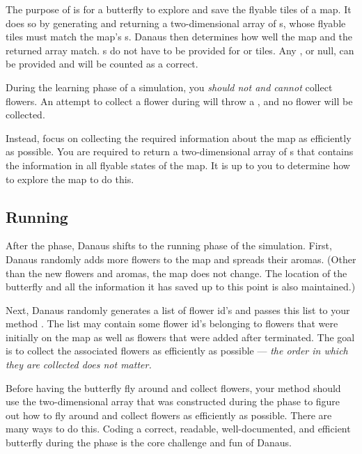 \documentclass{pset}
\begin{document}
The purpose of  is for a butterfly to explore and save the
flyable tiles of a map. It does so by generating and returning a
two-dimensional array of s, whose flyable tiles must match the
map's s. Danaus then determines how well the map and the
returned array match. s do not have to be provided for
 or  tiles. Any , or null, can be
provided and will be counted as a correct.

During the learning phase of a simulation, you \emph{should not and cannot}
collect flowers. An attempt to collect a flower during  will
throw a , and no flower will be collected.

Instead, focus on collecting the required information about the map as
efficiently as possible. You are required to return a two-dimensional array of
s that contains the information in all flyable states of the
map. It is up to you to determine how to explore the map to do this. 
\fi

\ifx \RUNNING \undefined \else
\subsection{Running}
After the  phase, Danaus shifts to the running phase of the
simulation. First, Danaus  randomly adds more flowers to the map and spreads
their aromas. (Other than the new flowers and aromas, the map does not change.
The location of the butterfly and all the information it has saved up to this
point is also maintained.)

Next, Danaus  randomly generates a list of flower id's and passes this list to
your method . The list may contain some flower id's belonging to
flowers that were initially on the map as well as flowers that were added after
 terminated. The goal is to collect the associated flowers as
efficiently as possible --- \emph{the order in which they are collected does
not matter.}

Before having the butterfly fly around and collect flowers, your method
 should use the two-dimensional  array that was
constructed during the  phase to figure out how to fly around and
collect flowers as efficiently as possible. There are many ways to do this.
Coding a correct, readable, well-documented, and efficient butterfly during the
 phase is the core challenge and fun of Danaus.
\end{document}
